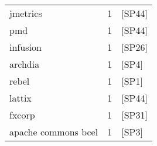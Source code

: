 \begin{tabular}{lrl}
            jmetrics &      1 &                                           [SP44] \\
                 pmd &      1 &                                           [SP44] \\
            infusion &      1 &                                           [SP26] \\
             archdia &      1 &                                            [SP4] \\
               rebel &      1 &                                            [SP1] \\
              lattix &      1 &                                           [SP44] \\
              fxcorp &      1 &                                           [SP31] \\
 apache commons bcel &      1 &                                            [SP3] \\
\bottomrule
\end{tabular}
